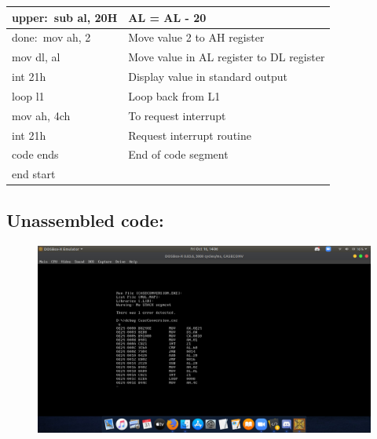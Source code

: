\documentclass[12pt,a4paper]{article}
\begin{document}
\begin{flushleft}
\begin{table}[htb]
{\begin{tabular}{|l|l|}
\hline
upper:~sub al, 20H                                               & AL = AL - 20                                  \\
\hline
done:~mov ah, 2                                                  & Move value 2 to AH register                   \\
\hline
mov dl, al                                                       & Move value in AL register to DL register      \\
\hline
int 21h                                                          & Display value in standard output              \\
\hline
loop l1                                                          & Loop back from L1                             \\
\hline
mov ah, 4ch                                                & To request interrupt                          \\
\hline
int 21h                                                          & Request interrupt routine                     \\ 
\hline
code ends                                                        & End of code segment                           \\
\hline
end start                                                        &                                               \\
\hline
\end{tabular}
}
\end{table}

\newpage
\subsection*{\textbf{Unassembled code:}}
\begin{figure}[h]
    \centering
    \includegraphics[trim = 100mm 60mm 200mm 110mm, clip, width = \textwidth]{Pics/CaseUS.png}
\end{figure}

\end{flushleft}
\end{document}
